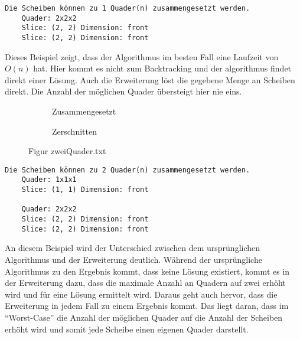 \documentclass[a4paper,10pt,ngerman]{scrartcl}
\newcommand{\simplecube}[8]%
{
    \begin{scope}[shift={#1}]
        \fill[gray!40,canvas is yz plane at x=#2, opacity=#8] (0,0) rectangle (#3,#4);
        \fill[gray!10,canvas is xz plane at y=#3, opacity=#8] (0,0) rectangle (#2,#4);
        \fill[white  ,canvas is xy plane at z=#4, opacity=#8] (0,0) rectangle (#2,#3);
        \foreach\i/\j in {0/1, 1/1, 1/0}
            {
            \draw[line#5] (0,#3*\i,#4*\j) --++ (#2,0,0);
            \draw[line#6] (#2*\i,0,#4*\j) --++ (0,#3,0);
            \draw[line#7] (#2*\i,#3*\j,0) --++ (0,0,#4);
        }
    \end{scope}
}
\newcommand{\unsolvedSquare}[4]%
{
    \begin{scope}[shift={#1}]
        \simplecube{(0,     0,      0)}     {1}{2}{2}   {a}{a}{a}   {1}
        \simplecube{(1+#4,   0,      0))}    {1}{2}{2}   {a}{a}{a}   {1}
        \simplecube{(2+2*#4,   0,      0))}    {1}{1}{1}   {a}{a}{a}   {1}
    \end{scope}
}
\begin{document}
    \begin{lstlisting}[frame=single, title=Programmausgabe kleinerWuerfel.txt, breaklines=true,label={lst:lstlisting3}]
    Die Scheiben können zu 1 Quader(n) zusammengesetzt werden.
    Quader: 2x2x2
    Slice: (2, 2) Dimension: front
    Slice: (2, 2) Dimension: front
    \end{lstlisting}

    Dieses Beispiel zeigt, dass der Algorithmus im besten Fall eine Laufzeit von $O(n)$ hat.
    Hier kommt es nicht zum Backtracking und der algorithmus findet direkt einer Lösung.
    Auch die Erweiterung löst die gegebene Menge an Scheiben direkt.
    Die Anzahl der möglichen Quader übersteigt hier nie eins.

    \begin{figure}[H]
        \centering
        \def\a{3.2}
        \def\b{1.2}
        \begin{subfigure}[b]{0.45\textwidth}
            \centering %
            \caption{Zusammengesetzt}\label{fig:figA3}
        \end{subfigure}
        \begin{subfigure}[b]{0.45\textwidth}
            \centering %
            \caption{Zerschnitten}\label{fig:figB3}
        \end{subfigure}
        \caption{Figur zweiQuader.txt}\label{fig:figAB3}
    \end{figure}

    \begin{lstlisting}[frame=single, title=Programmausgabe zweiQuader.txt, breaklines=true,label={lst:lstlisting4}]
    Die Scheiben können zu 2 Quader(n) zusammengesetzt werden.
    Quader: 1x1x1
    Slice: (1, 1) Dimension: front

    Quader: 2x2x2
    Slice: (2, 2) Dimension: front
    Slice: (2, 2) Dimension: front
    \end{lstlisting}

    An diesem Beispiel wird der Unterschied zwischen dem ursprünglichen Algorithmus und der Erweiterung deutlich.
    Während der ursprüngliche Algorithmus zu den Ergebnis kommt, dass keine Lösung existiert,
    kommt es in der Erweiterung dazu, dass die maximale Anzahl an Quadern auf zwei erhöht wird und für eine Lösung ermittelt wird.
    Daraus geht auch hervor, dass die Erweiterung in jedem Fall zu einem Ergebnis kommt.
    Das liegt daran, dass im ``Worst-Case'' die Anzahl der möglichen Quader auf die Anzahl der Scheiben erhöht wird
    und somit jede Scheibe einen eigenen Quader darstellt.
\end{document}
